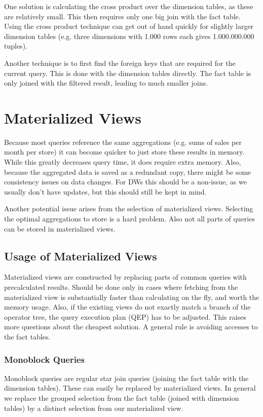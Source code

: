 \documentclass{article}
\begin{document}
One solution is calculating the cross product over the dimension tables, as these are relatively small.
This then requires only one big join with the fact table.
Using the cross product technique can get out of hand quickly for slightly larger dimension tables (e.g. three dimensions with 1.000 rows each gives 1.000.000.000 tuples).

Another technique is to first find the foreign keys that are required for the current query.
This is done with the dimension tables directly.
The fact table is only joined with the filtered result, leading to much smaller joins.

\section{Materialized Views}
Because most queries reference the same aggregations (e.g. sums of sales per month per store) it can become quicker to just store these results in memory.
While this greatly decreases query time, it does require extra memory.
Also, because the aggregated data is saved as a redundant copy, there might be some consistency issues on data changes.
For DWs this should be a non-issue, as we usually don't have updates, but this should still be kept in mind.

Another potential issue arises from the selection of materialized views.
Selecting the optimal aggregations to store is a hard problem.
Also not all parts of queries can be stored in materialized views.

\subsection{Usage of Materialized Views}
Materialized views are constructed by replacing parts of common queries with precalculated results.
Should be done only in cases where fetching from the materialized view is substantially faster than calculating on the fly, and worth the memory usage.
Also, if the existing views do not exactly match a branch of the operator tree, the query execution plan (QEP) has to be adjusted.
This raises more questions about the cheapest solution.
A general rule is avoiding accesses to the fact tables.

\subsubsection{Monoblock Queries}
Monoblock queries are regular star join queries (joining the fact table with the dimension tables).
These can easily be replaced by materialized views.
In general we replace the grouped selection from the fact table (joined with dimension tables) by a distinct selection from our materialized view.
\end{document}
